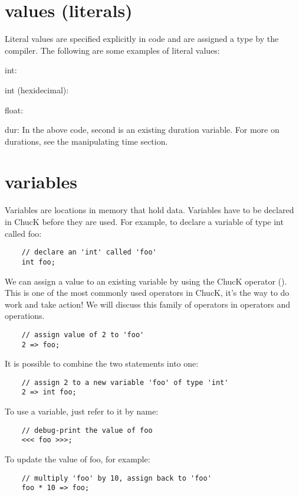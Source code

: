 \section{values (literals)}

Literal values are specified explicitly in code and are assigned a type by the compiler. The following are some examples of literal values:

int:

int (hexidecimal):

float:

dur:
 In the above code, second is an existing duration variable. For more on durations, see the manipulating time section.
 

\section{variables}

Variables are locations in memory that hold data. Variables have to be declared in ChucK before they are used. For example, to declare a variable of type int called foo:
\begin{verbatim}
    // declare an 'int' called 'foo'
    int foo;
\end{verbatim}

We can assign a value to an existing variable by using the ChucK operator (\chuckop). This is one of the most commonly used operators in ChucK, it's the way to do work and take action! We will discuss this family of operators in operators and operations.
\begin{verbatim}
    // assign value of 2 to 'foo'
    2 => foo;
\end{verbatim}

It is possible to combine the two statements into one:
\begin{verbatim}
    // assign 2 to a new variable 'foo' of type 'int'
    2 => int foo;
\end{verbatim}

To use a variable, just refer to it by name:
\begin{verbatim}
    // debug-print the value of foo
    <<< foo >>>;
\end{verbatim}

To update the value of foo, for example:
\begin{verbatim}
    // multiply 'foo' by 10, assign back to 'foo'
    foo * 10 => foo;
\end{verbatim}

